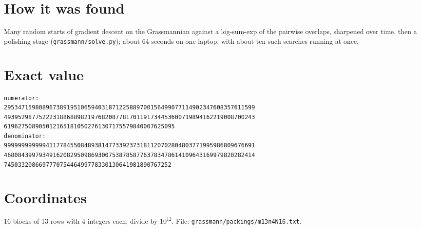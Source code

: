 \documentclass[11pt,a4paper]{article}
\begin{document}
\section{How it was found}
Many random starts of gradient descent on the Grassmannian against a log-sum-exp of the pairwise overlaps, sharpened over time, then a polishing stage (\texttt{grassmann/solve.py}); about 64 seconds on one laptop, with about ten such searches running at once.


\appendix
\section{Exact value}
{\small
\begin{verbatim}
numerator:
295347159808967389195106594031871225889700156499077114902347608357611599
493952987752223188688982197682087781701191734453600719894162219008700243
6196275089050121651810502761307175579840007625095
denominator:
999999999999411778455084893814773392373181120702804803771995986809676691
468084399793491620829509869300753878587763783478614109643169979820282414
745033208669777075446499778330130641981890767252
\end{verbatim}}

\section{Coordinates}
16 blocks of 13 rows with 4 integers each; divide by $10^{12}$. File: \texttt{grassmann/packings/m13n4N16.txt}.
{\tiny
\begin{multicols}{3}
\end{multicols}}
\end{document}
